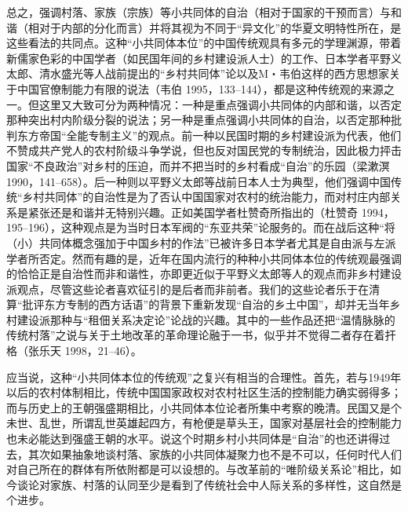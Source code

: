 \documentclass[a4paper,12pt,punct=kaiming]{ctexart}
\begin{document}
总之，强调村落、家族（宗族）等小共同体的自治（相对于国家的干预而言）与和谐（相对于内部的分化而言）并将其视为不同于“异文化”的华夏文明特性所在，是这些看法的共同点。这种“小共同体本位”的中国传统观具有多元的学理渊源，带着新儒家色彩的中国学者（如民国年间的乡村建设派人士）的工作、日本学者平野义太郎、清水盛光等人战前提出的“乡村共同体”论以及M・韦伯这样的西方思想家关于中国官僚制能力有限的说法（韦伯 1995，133–144），都是这种传统观的来源之一。但这里又大致可分为两种情况：一种是重点强调小共同体的内部和谐，以否定那种突出村内阶级分裂的说法；另一种是重点强调小共同体的自治，以否定那种批判东方帝国“全能专制主义”的观点。前一种以民国时期的乡村建设派为代表，他们不赞成共产党人的农村阶级斗争学说，但也反对国民党的专制统治，因此极力抨击国家“不良政治”对乡村的压迫，而并不把当时的乡村看成“自治”的乐园（梁漱溟 1990，141–658）。后一种则以平野义太郎等战前日本人士为典型，他们强调中国传统“乡村共同体”的自治性是为了否认中国国家对农村的统治能力，而对村庄内部关系是紧张还是和谐并无特别兴趣。正如美国学者杜赞奇所指出的（杜赞奇 1994，195–196），这种观点是为当时日本军阀的“东亚共荣”论服务的。而在战后这种“将（小）共同体概念强加于中国乡村的作法”已被许多日本学者尤其是自由派与左派学者所否定。然而有趣的是，近年在国内流行的种种小共同体本位的传统观最强调的恰恰正是自治性而非和谐性，亦即更近似于平野义太郎等人的观点而非乡村建设派观点，尽管这些论者喜欢征引的是后者而非前者。我们的这些论者乐于在清算“批评东方专制的西方话语”的背景下重新发现“自治的乡土中国”，却并无当年乡村建设派那种与“租佃关系决定论”论战的兴趣。其中的一些作品还把“温情脉脉的传统村落”之说与关于土地改革的革命理论融于一书，似乎并不觉得二者存在着扞格（张乐天 1998，21–46）。

应当说，这种“小共同体本位的传统观”之复兴有相当的合理性。首先，若与1949年以后的农村体制相比，传统中国国家政权对农村社区生活的控制能力确实弱得多；而与历史上的王朝强盛期相比，小共同体本位论者所集中考察的晚清。民国又是个未世、乱世，所谓乱世英雄起四方，有枪便是草头王，国家对基层社会的控制能力也未必能达到强盛王朝的水平。说这个时期乡村小共同体是“自治”的也还讲得过去，其次如果抽象地谈村落、家族的小共同体凝聚力也不是不可以，任何时代人们对自己所在的群体有所依附都是可以设想的。与改革前的“唯阶级关系论”相比，如今谈论对家族、村落的认同至少是看到了传统社会中人际关系的多样性，这自然是个进步。
\end{document}
